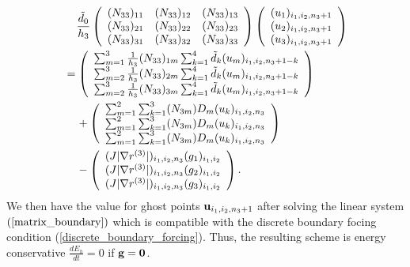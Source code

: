 \documentclass[a4paper]{article}
\begin{document}
\begin{align}\label{matrix_boundary}
&\hspace{0.4cm}\frac{\tilde{d}_0}{h_3}\left(\begin{array}{ccc}
(N_{33})_{11}&(N_{33})_{12} & (N_{33})_{13}\\
(N_{33})_{21} &(N_{33})_{22} &(N_{33})_{23}\\
(N_{33})_{31} &(N_{33})_{32} &(N_{33})_{33}
\end{array}\right) \left(\begin{array}{c}
(u_1)_{i_1,i_2,n_3+1}\\
(u_2)_{i_1,i_2,n_3+1}\\
(u_3)_{i_1,i_2,n_3+1}
\end{array}\right)\nonumber\\
&= \left(\begin{array}{ccc}
\sum_{m=1}^3\frac{1}{h_3}(N_{33})_{1m}\sum_{k=1}^4\tilde{d}_k(u_m)_{i_1,i_2,n_3+1-k}\\
\sum_{m=2}^3\frac{1}{h_3}(N_{33})_{2m}\sum_{k=1}^4\tilde{d}_k(u_m)_{i_1,i_2,n_3+1-k}\\
\sum_{m=2}^3\frac{1}{h_3}(N_{33})_{3m}\sum_{k=1}^4\tilde{d}_k(u_m)_{i_1,i_2,n_3+1-k}
\end{array}\right)\nonumber\\
&\hspace{0.4cm}+\left(\begin{array}{ccc}
\sum_{m=1}^2\sum_{k=1}^3(N_{3m})D_m(u_k)_{i_1,i_2,n_3}\\
\sum_{m=1}^2\sum_{k=1}^3(N_{3m})D_m(u_k)_{i_1,i_2,n_3}\\
\sum_{m=1}^2\sum_{k=1}^3(N_{3m})D_m(u_k)_{i_1,i_2,n_3}
\end{array}\right)\nonumber\\
&\hspace{0.4cm}-\left(\begin{array}{ccc}
(J|\nabla r^{(3)}|)_{i_1,i_2,n_3}(g_1)_{i_1,i_2}\\
(J|\nabla r^{(3)}|)_{i_1,i_2,n_3}(g_2)_{i_1,i_2}\\
(J|\nabla r^{(3)}|)_{i_1,i_2,n_3}(g_3)_{i_1,i_2}
\end{array}\right).
\end{align}
We then have the value for ghost points ${\bf u}_{i_1,i_2,n_3+1}$  after solving the linear system $(\ref{matrix_boundary})$ which is compatible with the discrete boundary focing condition (\ref{discrete_boundary_forcing}). Thus, the resulting scheme is energy conservative $\frac{dE_h}{dt} = 0$ if ${\bf g} = {\bf 0}$.
\end{document}
